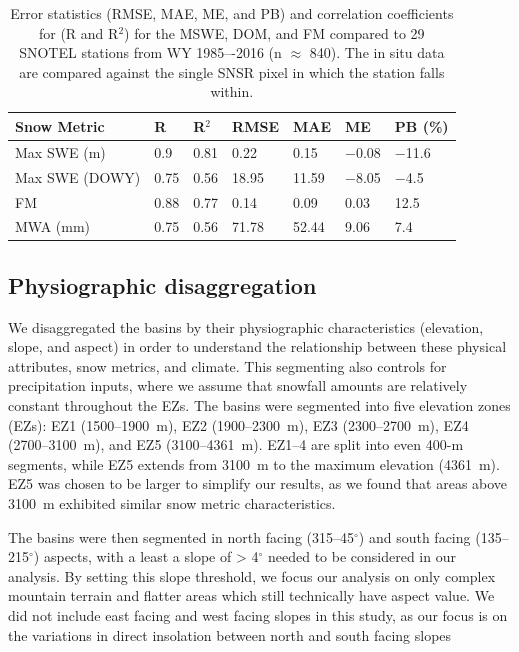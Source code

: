 \begin{table}[htbp]
  \centering
  \caption{Error statistics (RMSE, MAE, ME, and PB) and correlation coefficients for (R and R$^{2}$) for the MSWE, DOM, and FM compared to 29 SNOTEL stations from WY 1985–-2016 (n $\approx$ 840). The in situ data are compared against the single SNSR pixel in which the station falls within.}
  \label{tab:snow_metrics_val_table}
  \begin{tabular}{lllllll}
    \toprule
    Snow Metric & R & R$^{2}$ & RMSE & MAE & ME & PB (\%) \\
    \midrule
    Max SWE (m) & 0.9 & 0.81 & 0.22 & 0.15 & $-$0.08 & $-$11.6 \\
    Max SWE (DOWY) & 0.75 & 0.56 & 18.95 & 11.59 & $-$8.05 & $-$4.5 \\
    FM & 0.88 & 0.77 & 0.14 & 0.09 & 0.03 & 12.5 \\
    MWA (mm) & 0.75 & 0.56 & 71.78 & 52.44 & 9.06 & 7.4 \\
    \bottomrule
  \end{tabular}
\end{table}

\hypertarget{ch2-methods-2}{\subsection{Physiographic disaggregation}\label{ch2-methods-2}}

We disaggregated the basins by their physiographic characteristics (elevation, slope, and aspect) in order to understand the relationship between these physical attributes, snow metrics, and climate. This segmenting also controls for precipitation inputs, where we assume that snowfall amounts are relatively constant throughout the EZs. The basins were segmented into five elevation zones (EZs): EZ1 (1500--1900~m), EZ2 (1900--2300~m), EZ3 (2300--2700~m), EZ4 (2700--3100~m), and EZ5 (3100--4361~m). EZ1--4 are split into even 400-m segments, while EZ5 extends from 3100~m to the maximum elevation (4361~m). EZ5 was chosen to be larger to simplify our results, as we found that areas above 3100~m exhibited similar snow metric characteristics. 

The basins were then segmented in north facing (315--45$^{\circ}$) and south facing (135--215$^{\circ}$) aspects, with a least a slope of > 4$^{\circ}$ needed to be considered in our analysis. By setting this slope threshold, we focus our analysis on only complex mountain terrain and flatter areas which still technically have aspect value. We did not include east facing and west facing slopes in this study, as our focus is on the variations in direct insolation between north and south facing slopes

